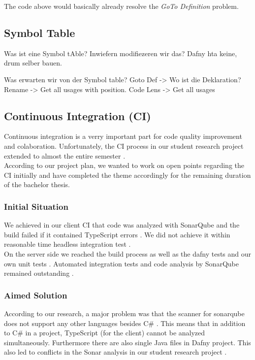 The code above would basically already resolve the \textit{GoTo Definition} problem.

\subsection{Symbol Table}
Was ist eine Symbol tAble?
Inwiefern modifiezeren wir das?
Dafny hta keine, drum selber bauen.

Was erwarten wir von der Symbol table?
Goto Def -> Wo ist die Deklaration?
Rename -> Get all usages with position.
Code Lens -> Get all usages


    










\subsection{Continuous Integration (CI)}
Continuous integration is a verry important part for code quality improvement and colaboration.
Unfortunately, the CI process in our student research project extended to almost the entire semester \cite{sa}. \\

According to our project plan, we wanted to work on open points regarding the CI initially and have completed the theme accordingly for the remaining duration of the bachelor thesis.

\subsubsection{Initial Situation}
We achieved in our client CI that code was analyzed with SonarQube and the build failed if it contained TypeScript errors \cite{sa}.
We did not achieve it within reasonable time headless integration test \cite{sa}. \\

On the server side we reached the build process as well as the dafny tests and our own unit tests \cite{sa}.
Automated integration tests and code analysis by SonarQube remained outstanding \cite{sa}.

\subsubsection{Aimed Solution}
According to our research, a major problem was that the scanner for sonarqube does not support any other languages besides C\# \cite{sonar-supports-only-one-language}.
This means that in addition to C\# in a project, TypeScript (for the client) cannot be analyzed simultaneously.
Furthermore there are also single Java files in Dafny project.
This also led to conflicts in the Sonar analysis in our student research project \cite{sa}. \\

